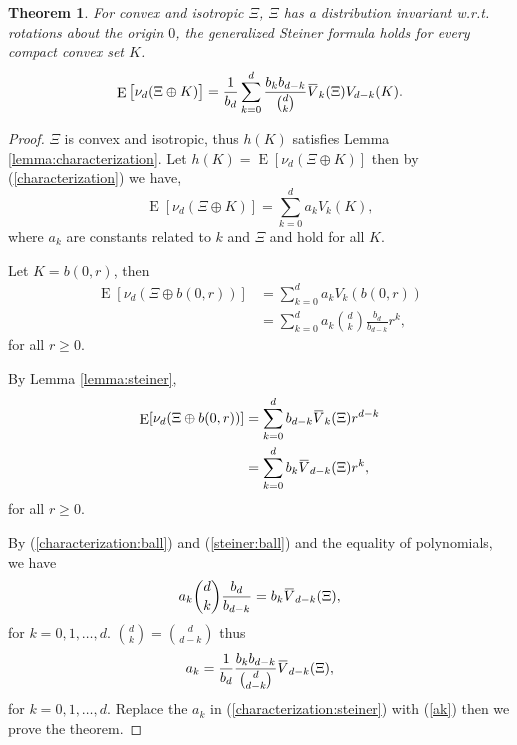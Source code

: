 \documentclass[10pt, conference, letterpaper]{IEEEtran}
\newtheorem{theorem}{Theorem}
\DeclareMathOperator*{\E}{\mathrm{E}}
\newcommand{\overbar}[1]{\mkern 1.5mu\overline{\mkern-1.5mu#1\mkern-1.5mu}\mkern 1.5mu}
\begin{document}
\begin{theorem}
	For convex and isotropic $\Xi$, $\Xi$ has a distribution invariant w.r.t. rotations about the origin $0$, the generalized Steiner formula holds for every compact convex set $K$. 
	\begin{equation}
	\E\big[\nu_d(\Xi\oplus K)\big] = \frac{1}{b_d}\sum\limits_{k=0}^{d}\frac{b_k b_{d-k}}{{d \choose k}}\overbar{V}_k(\Xi) V_{d-k}(K).
	\end{equation}
\end{theorem}
\begin{proof}
	$\Xi$ is convex and isotropic, thus $h(K)$ satisfies Lemma \ref{lemma:characterization}. Let $h(K) = \E[\nu_d(\Xi \oplus K)]$ then by (\ref{characterization}) we have, 
	\begin{equation}\label{characterization:steiner}
	\E[\nu_d(\Xi\oplus K)] = \sum\limits_{k=0}^{d}a_kV_k(K),
	\end{equation}
	where $a_k$ are constants related to $k$ and $\Xi$ and hold for all $K$. 
	
	Let $K=b(0, r)$, then 
	\begin{equation}\label{characterization:ball}
	\begin{aligned}
	\E[\nu_d(\Xi\oplus b(0,r))] &= \sum\limits_{k=0}^{d}a_kV_k(b(0,r))\\
	& = \sum\limits_{k=0}^{d} a_k{d \choose k}\frac{b_d}{b_{d-k}}r^k,
	\end{aligned}
	\end{equation}
	for all $r\geq 0$.
	
	By Lemma \ref{lemma:steiner}, 
	\begin{equation}\label{steiner:ball}
	\begin{aligned}
	\E[\nu_d(\Xi\oplus b(0,r))] &= \sum\limits_{k=0}^{d}b_{d-k}\overbar{V}_k(\Xi)r^{d-k}\\
	& = \sum\limits_{k=0}^{d}b_k\overbar{V}_{d-k}(\Xi)r^k,
	\end{aligned}
	\end{equation}
	for all $r\geq 0$.
	
	By (\ref{characterization:ball}) and (\ref{steiner:ball}) and the equality of polynomials, we have 
	\begin{equation*}
	a_k{d \choose k}\frac{b_d}{b_{d-k}} = b_k\overbar{V}_{d-k}(\Xi),
	\end{equation*}
	for $k = 0, 1,\ldots, d$. ${d\choose k} = {d\choose {d-k}}$ thus
	\begin{equation}\label{ak}
	a_k = \frac{1}{b_d}\frac{b_kb_{d-k}}{{d\choose {d-k}}}\overbar{V}_{d-k}(\Xi),
	\end{equation}
	for $k = 0, 1,\ldots, d$. Replace the $a_k$ in (\ref{characterization:steiner}) with (\ref{ak}) then we prove the theorem.
\end{proof}
\end{document}
